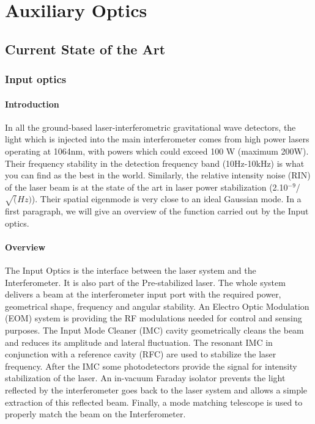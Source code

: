 \section{Auxiliary Optics}
\subsection{Current State of the Art}
\subsubsection{Input optics}
\paragraph{Introduction}
In all the ground-based laser-interferometric gravitational wave detectors, the light which is injected into the main interferometer comes from high power lasers operating at 1064nm, with powers which could exceed 100 W (maximum 200W). Their frequency stability in the detection frequency band (10Hz-10kHz) is what you can find as the best in the world. Similarly, the relative intensity noise (RIN) of the laser beam is at the state of the art in laser power stabilization (2.10$^{-9}$/$\sqrt(Hz)$). Their spatial eigenmode is very close to an ideal Gaussian mode. In a first paragraph, we will give an overview of the function carried out by the Input optics.

\paragraph {Overview}

The Input Optics is the interface between the laser system and the Interferometer. It is also part of the Pre-stabilized laser. The whole system delivers a beam at the interferometer input port with the required power, geometrical shape, frequency and angular stability. An Electro Optic Modulation (EOM) system is providing the RF modulations needed for control and sensing purposes. The Input Mode Cleaner (IMC) cavity geometrically cleans the beam and reduces its amplitude and lateral fluctuation. The resonant IMC in conjunction with a reference cavity (RFC) are used to stabilize the laser frequency.
After the IMC some photodetectors provide the signal for intensity stabilization of the laser. An in-vacuum Faraday isolator prevents the light reflected by the interferometer goes back to the laser system and allows a simple extraction of this reflected beam. Finally, a mode matching telescope is used to properly match the beam on the Interferometer.

